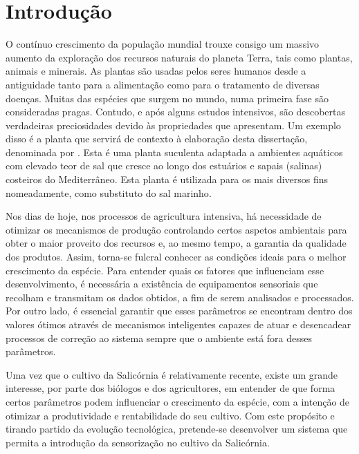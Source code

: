 \chapter{Introdução}



O contínuo crescimento da população mundial trouxe consigo um massivo aumento da exploração dos recursos naturais do planeta Terra, tais como plantas, animais e minerais. As plantas são usadas pelos seres humanos desde a antiguidade tanto para a alimentação como para o tratamento de diversas doenças. Muitas das espécies que surgem no mundo, numa primeira fase são consideradas pragas. Contudo, e após alguns estudos intensivos, são descobertas verdadeiras preciosidades devido às propriedades que apresentam\cite{Verma2008}\cite{Newman2012}. Um exemplo disso é a planta que servirá de contexto à elaboração desta dissertação, denominada por \sr. Esta é uma planta suculenta adaptada a ambientes aquáticos com elevado teor de sal que cresce ao longo dos estuários e sapais (salinas) costeiros do Mediterrâneo\cite{Ventura2011}. Esta planta é utilizada para os mais diversos fins nomeadamente, como substituto do sal marinho\cite{jnsalic}. 





Nos dias de hoje, nos processos de agricultura intensiva, há necessidade de otimizar os mecanismos de produção controlando certos aspetos ambientais para obter o maior proveito dos recursos e, ao mesmo tempo, a garantia da qualidade dos produtos. Assim, torna-se fulcral conhecer as condições ideais para o melhor crescimento da espécie. Para entender quais os fatores que influenciam esse desenvolvimento, é necessária a existência de equipamentos sensoriais que recolham e transmitam os dados obtidos, a fim de serem analisados e processados. Por outro lado, é essencial garantir que esses parâmetros se encontram dentro dos valores ótimos através de mecanismos inteligentes capazes de atuar e desencadear processos de correção ao sistema sempre que o ambiente está fora desses parâmetros. 


Uma vez que o cultivo da Salicórnia é relativamente recente, existe um grande interesse, por parte dos biólogos e dos agricultores, em entender de que forma certos parâmetros podem influenciar o crescimento da espécie, com a intenção de otimizar a produtividade e rentabilidade do seu cultivo. Com este propósito e tirando partido da evolução tecnológica, pretende-se desenvolver um sistema que permita a introdução da sensorização no cultivo da Salicórnia.     


